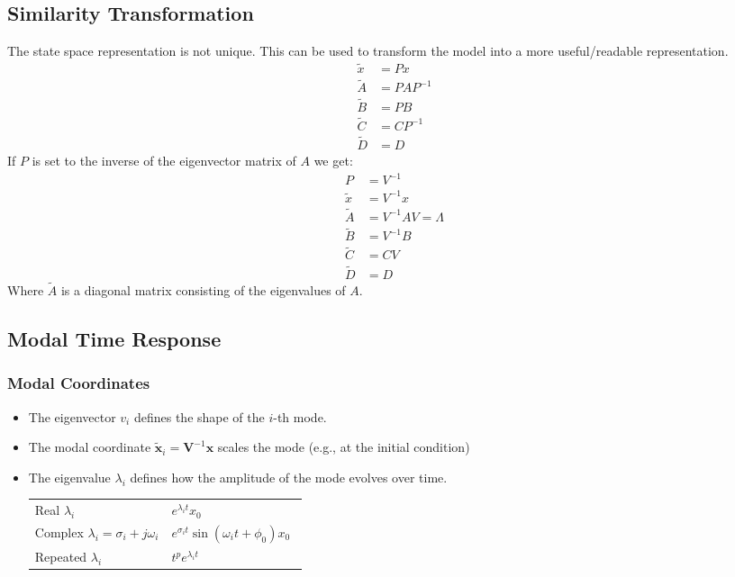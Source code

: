 \subsection{Similarity Transformation}
The state space representation is not unique. This can be used to transform the model into a more \flqq{}useful/readable\frqq{} representation.
\begin{align*}
    \tilde{x} & = Px       \\
    \tilde{A} & = PAP^{-1} \\
    \tilde{B} & = PB       \\
    \tilde{C} & = CP^{-1}  \\
    \tilde{D} & = D
\end{align*}
If $P$ is set to the inverse of the eigenvector matrix of $A$ we get:
\begin{align*}
    P         & = V^{-1}             \\
    \tilde{x} & = V^{-1}x            \\
    \tilde{A} & = V^{-1}AV = \Lambda \\
    \tilde{B} & = V^{-1}B            \\
    \tilde{C} & = CV                 \\
    \tilde{D} & = D
\end{align*}
Where $\tilde{A}$ is a diagonal matrix consisting of the eigenvalues of $A$.

\subsection{Modal Time Response}
\subsubsection{Modal Coordinates}
\begin{itemize}
    \item The eigenvector $v_i$ defines the shape of the $i$-th mode.
    \item The modal coordinate $\tilde{\mathbf{x}}_i=\mathbf{V}^{-1}\mathbf{x}$ scales the mode (e.g., at the initial condition)
    \item The eigenvalue $\lambda_i$ defines how the amplitude of the mode evolves over time.
          
          \begin{tabularx}{\linewidth}{@{}p{0.5\linewidth}X@{}}
              \quad Real $\lambda_i$                            & \textrightarrow{} $e^{\lambda_i t}x_0$                         \\
              \quad Complex $\lambda_i = \sigma_i + j \omega_i$ & \textrightarrow{} $e^{\sigma_i t}\sin(\omega_i t + \phi_0)x_0$ \\
              \quad Repeated $\lambda_i$                        & \textrightarrow{} $t^p e^{\lambda_i t}$
          \end{tabularx}
\end{itemize}

